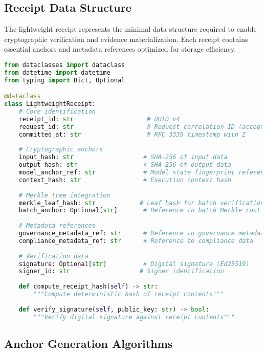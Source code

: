 \documentclass[12pt,a4paper]{article}
\begin{document}
\subsection{Receipt Data Structure}

The lightweight receipt represents the minimal data structure required to enable cryptographic verification and evidence materialization. Each receipt contains essential anchors and metadata references optimized for storage efficiency.

\begin{lstlisting}[language=Python, caption=Lightweight Receipt Data Structure]
from dataclasses import dataclass
from datetime import datetime
from typing import Dict, Optional

@dataclass
class LightweightReceipt:
    # Core identification
    receipt_id: str                    # UUID v4
    request_id: str                    # Request correlation ID (accepts operation_id alias on ingest)
    committed_at: str                  # RFC 3339 timestamp with Z
    
    # Cryptographic anchors
    input_hash: str                   # SHA-256 of input data
    output_hash: str                  # SHA-256 of output data
    model_anchor_ref: str             # Model state fingerprint reference
    context_hash: str                 # Execution context hash
    
    # Merkle tree integration
    merkle_leaf_hash: str            # Leaf hash for batch verification
    batch_anchor: Optional[str]       # Reference to batch Merkle root
    
    # Metadata references
    governance_metadata_ref: str      # Reference to governance metadata
    compliance_metadata_ref: str      # Reference to compliance data
    
    # Verification data
    signature: Optional[str]          # Digital signature (Ed25519)
    signer_id: str                   # Signer identification
    
    def compute_receipt_hash(self) -> str:
        """Compute deterministic hash of receipt contents"""
        
    def verify_signature(self, public_key: str) -> bool:
        """Verify digital signature against receipt contents"""
\end{lstlisting}

\subsection{Anchor Generation Algorithms}
\end{document}
